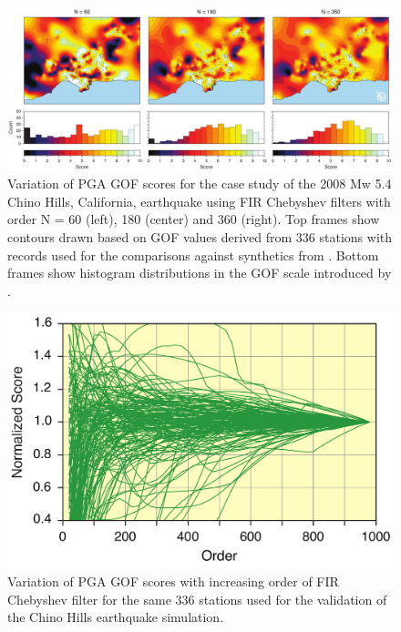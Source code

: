\documentclass{article}
\begin{document}
\begin{figure} [H]
\begin{center}  
\includegraphics[scale=0.36]{figures/pdf/figure1.pdf} 
\caption{Variation of PGA GOF scores for the case study of the 2008 Mw 5.4 Chino Hills, California, earthquake using FIR Chebyshev filters with order N = 60 (left), 180 (center) and 360 (right). Top frames show contours drawn based on GOF values derived from 336 stations with records used for the comparisons against synthetics from \citet{Taborda_2013_BSSA}. Bottom frames show histogram distributions in the GOF scale introduced by \citet{Anderson_2004}.}
\end{center}   
\end{figure}



\begin{figure} [H]
\begin{center}  
\includegraphics[scale=0.4]{figures/pdf/figure2.pdf} 
\caption{Variation of PGA GOF scores with increasing order of FIR Chebyshev  filter for the same 336 stations used for the  validation of the Chino Hills earthquake simulation.}
\end{center}   
\end{figure}
\end{document}
